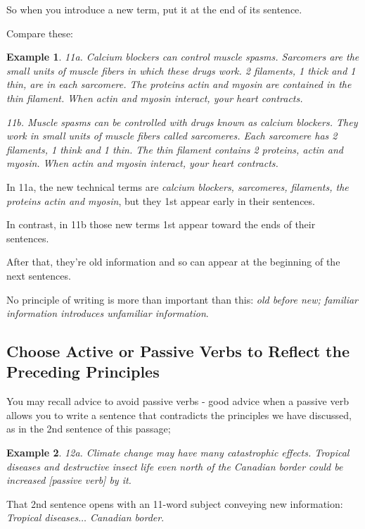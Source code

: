 \documentclass[oneside]{book}
\numberwithin{equation}{section}
\newtheorem{example}{Example}[section]
\begin{document}
%

So when you introduce a new term, put it at the end of its sentence.

Compare these:
\begin{example}
    11a. Calcium blockers can control muscle spasms. Sarcomers are the small units of muscle fibers in which these drugs work. 2 filaments, 1 thick and 1 thin, are in each sarcomere. The proteins actin and myosin are contained in the thin filament. When actin and myosin interact, your heart contracts.
    
    11b. Muscle spasms can be controlled with drugs known as \emph{calcium blockers}. They work in small units of muscle fibers called \emph{sarcomeres}. Each sarcomere has \emph{2 filaments, 1 think and 1 thin}. The thin filament contains \emph{2 proteins, actin and myosin}. When actin and myosin interact, your heart contracts.
\end{example}
In 11a, the new technical terms are \textit{calcium blockers, sarcomeres, filaments, the proteins actin and myosin}, but they 1st appear early in their sentences.

In contrast, in 11b those new terms 1st appear toward the ends of their sentences.

After that, they're old information and so can appear at the beginning of the next sentences.

%
No principle of writing is more than important than this: \textit{old before new; familiar information introduces unfamiliar information}.

\subsection{Choose Active or Passive Verbs to Reflect the Preceding Principles}
You may recall advice to avoid passive verbs - good advice when a passive verb allows you to write a sentence that contradicts the principles we have discussed, as in the 2nd sentence of this passage;
\begin{example}
    12a. Climate change may have many catastrophic effects. Tropical diseases and destructive insect life even north of the Canadian border could be increased \emph{[passive verb]} by it.
\end{example}
That 2nd sentence opens with an 11-word subject conveying new information: \textit{Tropical diseases$\ldots$ Canadian border}.
\end{document}
